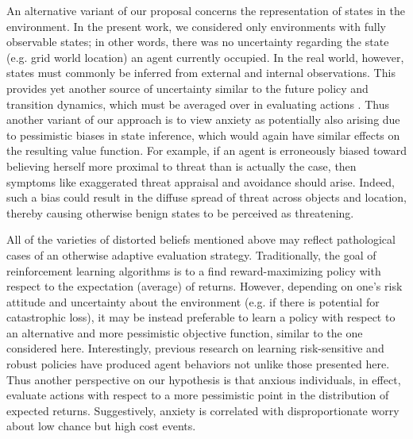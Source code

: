 \documentclass[11pt]{article} %
\begin{document}
An alternative variant of our proposal concerns the representation of states in the environment. In the present work, we considered only environments with fully observable states; in other words, there was no uncertainty regarding the state (e.g. grid world location) an agent currently occupied. In the real world, however, states must commonly be inferred from external and internal observations. This provides yet another source of uncertainty similar to the future policy and transition dynamics, which must be averaged over in evaluating actions \citep{kaelbling1998}. Thus another variant of our approach is to view anxiety as potentially also arising due to pessimistic biases in state inference\cite{Paulus2012}, which would again have similar effects on the resulting value function. For example, if an agent is erroneously biased toward believing herself more proximal to threat than is actually the case, then symptoms like exaggerated threat appraisal and avoidance should arise. Indeed, such a bias could result in the diffuse spread of threat across objects\citep{norbury2018} and location\citep{schulz2018}, thereby causing otherwise benign states to be perceived as threatening. 

All of the varieties of distorted beliefs mentioned above may reflect pathological cases of an otherwise adaptive evaluation strategy. Traditionally, the goal of reinforcement learning algorithms is to a find reward-maximizing policy with respect to the expectation (average) of returns. However, depending on one's risk attitude and uncertainty about the environment (e.g. if there is potential for catastrophic loss), it may be instead preferable to learn a policy with respect to an alternative and more pessimistic objective function, similar to the one considered here. Interestingly, previous research on learning risk-sensitive and robust policies \cite{morimura2012, chow2015, bellemare2017} have produced agent behaviors not unlike those presented here. Thus another perspective on our hypothesis is that anxious individuals, in effect, evaluate actions with respect to a more pessimistic point in the distribution of expected returns. Suggestively, anxiety is correlated with disproportionate worry about low chance but high cost events\cite{Miceli2005}. 
\end{document}
